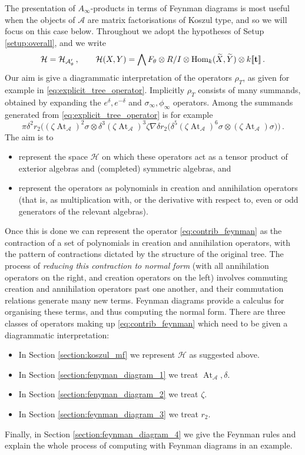 \documentclass[english,letter paper,12pt,leqno]{article}
\theoremstyle{example}
\numberwithin{equation}{section}
\def\AA{\mathcal{A}}
\def\HH{\HH}
\def\HH{\mathcal{H}}
\def\Hom{\operatorname{Hom}}
\def\be{\begin{equation}}
\def\ee{\end{equation}}
\DeclareMathOperator{\vAt}{At}
\begin{document}
The presentation of $A_\infty$-products in terms of Feynman diagrams is most useful when the objects of $\AA$ are matrix factorisations of Koszul type, and so we will focus on this case below. Throughout we adopt the hypotheses of Setup \ref{setup:overall}, and we write
\be\label{eq:hhalt_koszul}
\HH = \HH_{\AA'_\theta}\,, \qquad \HH(X,Y) = \bigwedge F_\theta \otimes R/I \otimes \Hom_k(\widetilde{X},\widetilde{Y}) \otimes k\llbracket \bold{t} \rrbracket\,.
\ee
Our aim is give a diagrammatic interpretation of the operators $\rho_T$, as given for example in \eqref{eq:explicit_tree_operator}. Implicitly $\rho_T$ consists of many summands, obtained by expanding the $e^{\delta}, e^{-\delta}$ and $\sigma_\infty, \phi_\infty$ operators. Among the summands generated from \eqref{eq:explicit_tree_operator} is for example
\be\label{eq:contrib_feynman}
\pi \delta^2 r_2\Big( (\zeta \vAt_{\AA})^2 \sigma \otimes \delta^3 (\zeta \vAt_{\AA})^3 \zeta \nabla \delta r_2\Big( \delta^5 (\zeta \vAt_{\AA})^6 \sigma \otimes (\zeta \vAt_{\AA}) \sigma \Big) \Big)\,.
\ee
The aim is to
\begin{itemize}
\item represent the space $\HH$ on which these operators act as a tensor product of exterior algebras and (completed) symmetric algebras, and
\item represent the operators as polynomials in creation and annihilation operators (that is, as multiplication with, or the derivative with respect to, even or odd generators of the relevant algebras).
\end{itemize}
Once this is done we can represent the operator \eqref{eq:contrib_feynman} as the contraction of a set of polynomials in creation and annihilation operators, with the pattern of contractions dictated by the structure of the original tree. The process of \emph{reducing this contraction to normal form} (with all annihilation operators on the right, and creation operators on the left) involves commuting creation and annihilation operators past one another, and their commutation relations generate many new terms. Feynman diagrams provide a calculus for organising these terms, and thus computing the normal form. There are three classes of operators making up \eqref{eq:contrib_feynman} which need to be given a diagrammatic interpretation:
\begin{itemize}
\item In Section \ref{section:koszul_mf} we represent $\HH$ as suggested above.
\item In Section \ref{section:fenyman_diagram_1} we treat $\vAt_{\AA}, \delta$.
\item In Section \ref{section:fenyman_diagram_2} we treat $\zeta$.
\item In Section \ref{section:feynman_diagram_3} we treat $r_2$.
\end{itemize}
Finally, in Section \ref{section:feynman_diagram_4} we give the Feynman rules and explain the whole process of computing with Feynman diagrams in an example.
\end{document}
